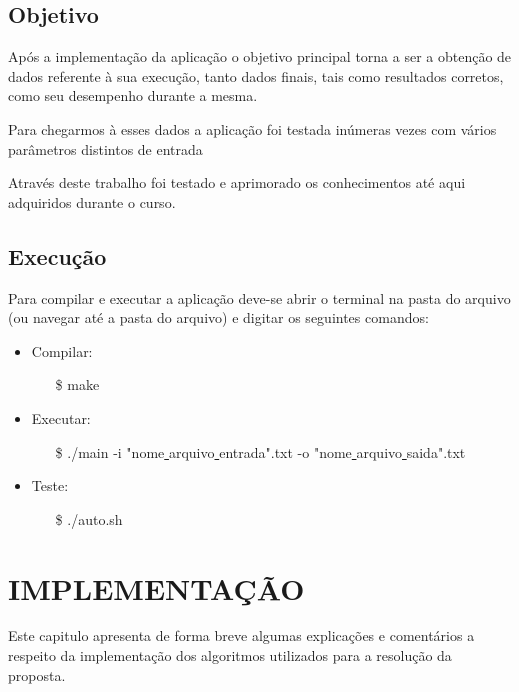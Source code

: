 \documentclass[12pt]{article}
\begin{document}
            
        \subsection{Objetivo}
            Após a implementação da aplicação o objetivo principal torna a ser a obtenção de 
            dados referente à sua execução, tanto dados finais, tais como resultados corretos, 
            como seu desempenho durante a mesma.

            Para chegarmos à esses dados a aplicação foi testada inúmeras vezes com vários
            parâmetros distintos de entrada 
            
            Através deste trabalho foi testado e aprimorado os conhecimentos
            até aqui adquiridos durante o curso.
        \subsection{Execução}
            Para compilar e executar a aplicação deve-se abrir o terminal na pasta 
            do arquivo (ou navegar até a pasta do arquivo) e digitar os seguintes comandos:
            \begin{itemize}
                \item Compilar: 
                \begin{itemize}
                    \item[\$] make
                \end{itemize}
                \item Executar: 
                \begin{itemize}
                    \item[\$] ./main -i "nome\underline{ }arquivo\underline{ }entrada".txt -o "nome\underline{ }arquivo\underline{ }saida".txt
                \end{itemize}
                \item Teste:
                \begin{itemize}
                    \item[\$] ./auto.sh
                \end{itemize}
            \end{itemize}
    \newpage
    \section{IMPLEMENTAÇÃO}
        Este capitulo apresenta de forma breve algumas explicações e comentários
        a respeito da implementação dos algoritmos utilizados para a resolução da proposta.
\end{document}
